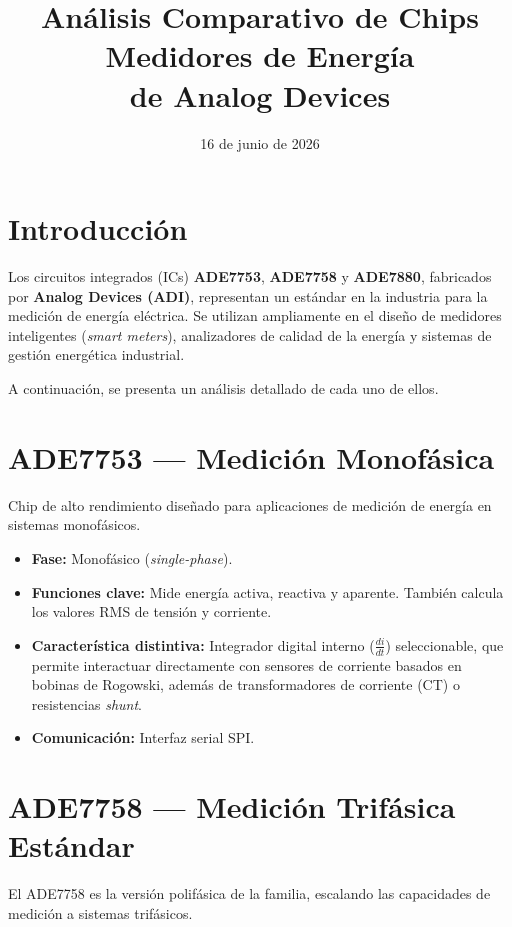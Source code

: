 \documentclass[12pt,a4paper]{article}
\title{Análisis Comparativo de Chips Medidores de Energía\\de Analog Devices}
\author{}
\date{16 de junio de 2026}
\begin{document}
\maketitle

\section{Introducción}

Los circuitos integrados (ICs) \textbf{ADE7753}, \textbf{ADE7758} y \textbf{ADE7880},
fabricados por \textbf{Analog Devices (ADI)}, representan un estándar en la industria
para la medición de energía eléctrica. Se utilizan ampliamente en el diseño de
medidores inteligentes (\textit{smart meters}), analizadores de calidad de la energía y
sistemas de gestión energética industrial.

A continuación, se presenta un análisis detallado de cada uno de ellos.

\section{ADE7753 --- Medición Monofásica}

Chip de alto rendimiento diseñado para aplicaciones de medición de energía en sistemas
monofásicos.

\begin{itemize}[itemsep=1ex]
    \item \textbf{Fase:} Monofásico (\textit{single-phase}).
    \item \textbf{Funciones clave:} Mide energía activa, reactiva y aparente. También
          calcula los valores RMS de tensión y corriente.
    \item \textbf{Característica distintiva:} Integrador digital interno
          ($\frac{di}{dt}$) seleccionable, que permite interactuar directamente con
          sensores de corriente basados en bobinas de Rogowski, además de
          transformadores de corriente (CT) o resistencias \textit{shunt}.
    \item \textbf{Comunicación:} Interfaz serial SPI.
\end{itemize}

\section{ADE7758 --- Medición Trifásica Estándar}

El ADE7758 es la versión polifásica de la familia, escalando las capacidades de medición
a sistemas trifásicos.
\end{document}
